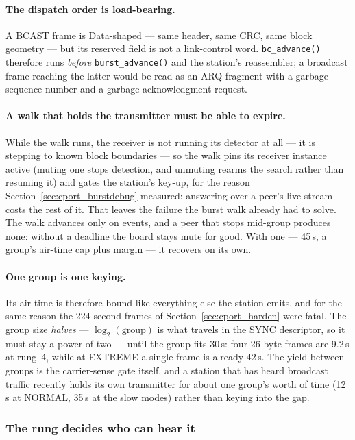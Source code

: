 \paragraph{The dispatch order is load-bearing.} A BCAST frame is
Data-shaped --- same header, same CRC, same block geometry --- but its
reserved field is not a link-control word. \texttt{bc\_advance()}
therefore runs \emph{before} \texttt{burst\_advance()} and the
station's reassembler; a broadcast frame reaching the latter would be
read as an ARQ fragment with a garbage sequence number and a garbage
acknowledgment request.

\paragraph{A walk that holds the transmitter must be able to expire.}
While the walk runs, the receiver is not running its detector at all
--- it is stepping to known block boundaries --- so the walk pins its
receiver instance active (muting one stops detection, and unmuting
rearms the search rather than resuming it) and gates the station's
key-up, for the reason Section~\ref{sec:cport_burstdebug} measured:
answering over a peer's live stream costs the rest of it. That leaves
the failure the burst walk already had to solve. The walk advances only
on events, and a peer that stops mid-group produces none: without a
deadline the board stays mute for good. With one --- 45\,s, a group's
air-time cap plus margin --- it recovers on its own.

\paragraph{One group is one keying.} Its air time is therefore bound
like everything else the station emits, and for the same reason the
224-second frames of Section~\ref{sec:cport_harden} were fatal. The
group size \emph{halves} --- $\log_2(\text{group})$ is what travels in
the SYNC descriptor, so it must stay a power of two --- until the group
fits 30\,s: four 26-byte frames are 9.2\,s at rung~4, while at EXTREME
a single frame is already 42\,s. The yield between groups is the
carrier-sense gate itself, and a station that has heard broadcast
traffic recently holds its own transmitter for about one group's worth
of time (12\,s at NORMAL, 35\,s at the slow modes) rather than keying
into the gap.

\subsubsection{The rung decides who can hear it}

